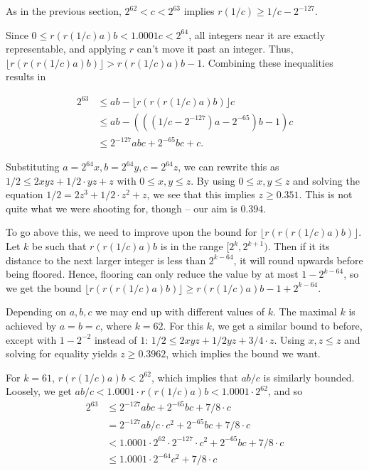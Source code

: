 \documentclass{article}
\begin{document}
As in the previous section, $2^{62} < c < 2^{63}$ implies $r(1/c) \ge 1/c - 2^{-127}$.

Since $0 \le r(r(1/c)a)b < 1.0001 c < 2^{64}$, all integers near it are exactly representable, and applying $r$ can't move it past an integer. Thus, $\lfloor r(r(r(1/c)a)b) \rfloor > r(r(1/c)a)b - 1$. Combining these inequalities results in

\begin{align*}
2^{63}
  &\le ab - \lfloor r(r(r(1/c)a)b)\rfloor c \\
  &\le ab - (((1/c - 2^{-127})a - 2^{-65})b - 1) c \\
  &\le 2^{-127}abc + 2^{-65}bc + c.
\end{align*}

Substituting $a = 2^{64}x, b = 2^{64}y, c = 2^{64}z$, we can rewrite this as $1/2 \le 2 xyz + 1/2 \cdot yz + z$ with $0 \le x, y \le z$.
By using $0 \le x, y \le z$ and solving the equation $1/2 = 2z^3 + 1/2 \cdot z^2 + z$, we see that this implies $z \ge 0.351$. This is not quite what we were shooting for, though -- our aim is $0.394$.

To go above this, we need to improve upon the bound for $\lfloor r(r(r(1/c)a)b) \rfloor$. Let $k$ be such that $r(r(1/c)a)b$ is in the range $[2^k, 2^{k+1})$. Then if it its distance to the next larger integer is less than $2^{k-64}$, it will round upwards before being floored. Hence, flooring can only reduce the value by at most $1 - 2^{k-64}$, so we get the bound $\lfloor r(r(r(1/c)a)b) \rfloor \ge r(r(1/c)a)b - 1 + 2^{k-64}$.

Depending on $a, b, c$ we may end up with different values of $k$. The maximal $k$ is achieved by $a = b = c$, where $k = 62$. For this $k$, we get a similar bound to before, except with $1 - 2^{-2}$ instead of $1$: $1/2 \le 2 xyz + 1/2yz + 3/4 \cdot z$. Using $x,z \le z$ and solving for equality yields $z \ge 0.3962$, which implies the bound we want.

For $k = 61$, $r(r(1/c)a)b < 2^{62}$, which implies that $ab/c$ is similarly bounded. Loosely, we get $ab/c < 1.0001 \cdot r(r(1/c)a)b < 1.0001 \cdot 2^{62}$, and so
\begin{align*}
2^{63}
  &\le 2^{-127}abc + 2^{-65}bc + 7/8 \cdot c \\
  &= 2^{-127}ab/c\cdot c^2 + 2^{-65}bc + 7/8 \cdot c \\
  &< 1.0001 \cdot 2^{62} \cdot 2^{-127}\cdot c^2 + 2^{-65}bc + 7/8 \cdot c \\
  &\le 1.0001 \cdot 2^{-64} c^2 + 7/8 \cdot c
\end{align*}
\end{document}
